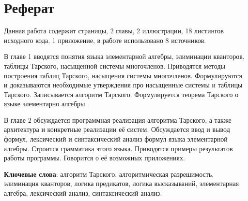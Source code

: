 \section*{Реферат}

Данная работа содержит \pageref{LastPage} страницы, 2 главы, 2 иллюстрации, 18 листингов исходного кода, 1 приложение, в работе использовано 8 источников.

В главе 1 вводятся понятия языка элементарной алгебры, элиминации кванторов, таблицы Тарского, насыщенной системы многочленов. Приводятся методы построения таблиц Тарского, насыщения системы многочленов. Формулируются и доказываются необходимые утверждения про насыщенные системы и таблицы Тарского. Записывается алгоритм Тарского. Формулируется теорема Тарского о языке элементарно алгебры.

В главе 2  обсуждается программная реализация алгоритма Тарского, а также архитектура и конкретные реализации её систем. Обсуждается ввод и вывод формул, лексический и синтаксический анализ формул языка элементарной алгебры. Строится грамматика этого языка. Приводятся примеры результатов работы программы. Говорится о её возможных приложениях.

\textbf{Ключевые слова}: алгоритм Тарского,
алгоритмическая разрешимость,
элиминация кванторов,
логика предикатов,
логика высказываний,
элементарная алгебра,
лексический анализ,
синтаксический анализ.